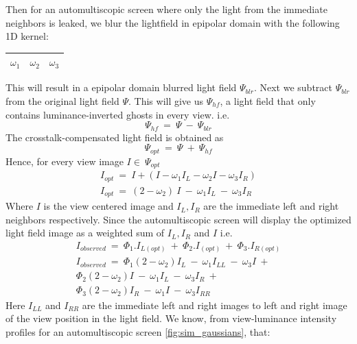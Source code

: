 \noindent 
Then for an automultiscopic screen where only the light from the immediate neighbors is leaked, we blur the lightfield in epipolar domain with the following 1D kernel:
\begin{table}[H]
\centering
\begin{tabular}{|c|c|c|}
\hline
$\omega_1$ & $\omega_2$ & $\omega_3$ \\
\hline
\end{tabular}
\label{tab:blurring_kernel}
\end{table}
\noindent
This will result in a epipolar domain blurred light field $\Psi_{blr}$. Next we subtract $\Psi_{blr}$ from the original light field $\Psi$. This will give us  $\Psi_{hf}$, a light field that only contains luminance-inverted ghosts in every view. i.e.
\begin{equation}
\Psi_{hf}\: =\: \Psi\: -\: \Psi_{blr}
\end{equation}
The crosstalk-compensated light field is obtained as
\begin{equation}
\Psi_{opt}\: =\: \Psi\: +\: \Psi_{hf}
\end{equation}
Hence, for every view image $I \in\: \Psi_{opt}$
\begin{equation}
\begin{aligned}
I_{opt}\: =\:  I + (I - \omega_1I_L - \omega_2I - \omega_3I_R) \\
I_{opt}\: = \: (2-\omega_2)\ I\: -\: \omega_1I_L\: -\: \omega_3I_R
\end{aligned}
\end{equation}
Where $I$ is the view centered image and $I_L, I_R$ are the immediate left and right neighbors respectively. Since the automultiscopic screen will display the optimized light field image as a weighted sum of $I_L, I_R$ and $I$ i.e.
\begin{equation}
\begin{aligned}
I_{observed}\: =\:  \Phi_1.I_{L(opt)}\: + \:\Phi_2.I_{(opt)}\: + \:\Phi_3.I_{R(opt)}       \\
I_{observed}\: = \: \Phi_1{(2-\omega_2) I_L\: -\: \omega_1I_{LL}\: -\: \omega_3I}\:+  \\
                    \Phi_2{(2-\omega_2) I\: -\: \omega_1I_{L}\: -\: \omega_3I_R}\:+   \\
                    \Phi_3{(2-\omega_2) I_R\: -\: \omega_1I\: -\: \omega_3I_{RR}}
\end{aligned}
\end{equation}
Here $I_{LL}$ and $I_{RR}$ are the immediate left and right images to left and right image of the view position in the light field. We know, from view-luminance intensity profiles for an automultiscopic screen \ref{fig:sim_gaussians}, that:
